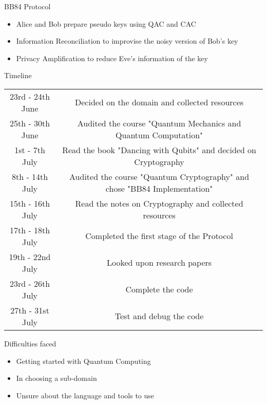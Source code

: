 \documentclass[11 pt]{beamer}
\begin{document}
\begin{frame}{BB84 Protocol}
    \begin{itemize}[<+->]
        \item Alice and Bob prepare pseudo keys using QAC and CAC
        \item Information Reconciliation to improvise the noisy version of Bob's key
        \item Privacy Amplification to reduce Eve's information of the key
    \end{itemize}
\end{frame}


\begin{frame}{Timeline}
        \begin{tabular}{c c}
            23rd - 24th June & Decided on the domain and collected resources\\
            25th - 30th June & Audited the course "Quantum Mechanics and Quantum Computation"\\
            1st - 7th July & Read the book "Dancing with Qubits" and decided on Cryptography\\
            8th - 14th July & Audited the course "Quantum Cryptography" and chose "BB84 Implementation"\\
            15th - 16th July & Read the notes on Cryptography and collected resources\\
            17th - 18th July & Completed the first stage of the Protocol\\
            19th - 22nd July & Looked upon research papers\\
            23rd - 26th July & Complete the code\\
            27th - 31st July & Test and debug the code\\
        \end{tabular}
\end{frame}

\begin{frame}{Difficulties faced}
	\begin{itemize}
		\item Getting started with Quantum Computing
        \item In choosing a sub-domain
        \item Unsure about the language and tools to use
	\end{itemize}
\end{frame}
		
\end{document}
